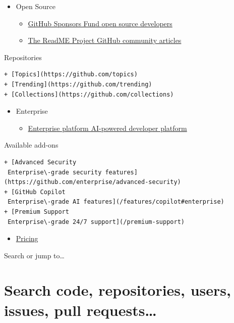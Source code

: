 \documentclass[
  letterpaper,
]{book}
\providecommand{\tightlist}{%
  \setlength{\itemsep}{0pt}\setlength{\parskip}{0pt}}\usepackage{longtable,booktabs,array}
\begin{document}
\begin{itemize}
\item
  Open Source

  \begin{itemize}
  \item
    \href{./sponsors}{GitHub Sponsors Fund open source developers}
  \item
    \href{https://github.com/readme}{The ReadME Project GitHub community
    articles}
  \end{itemize}
\end{itemize}

Repositories

\begin{verbatim}
+ [Topics](https://github.com/topics)
+ [Trending](https://github.com/trending)
+ [Collections](https://github.com/collections)
\end{verbatim}

\begin{itemize}
\item
  Enterprise

  \begin{itemize}
  \tightlist
  \item
    \href{./enterprise}{Enterprise platform AI-powered developer
    platform}
  \end{itemize}
\end{itemize}

Available add-ons

\begin{verbatim}
+ [Advanced Security
 Enterprise\-grade security features](https://github.com/enterprise/advanced-security)
+ [GitHub Copilot
 Enterprise\-grade AI features](/features/copilot#enterprise)
+ [Premium Support
 Enterprise\-grade 24/7 support](/premium-support)
\end{verbatim}

\begin{itemize}
\tightlist
\item
  \href{https://github.com/pricing}{Pricing}
\end{itemize}

Search or jump to\ldots{}


\chapter{Search code, repositories, users, issues, pull
requests\ldots{}}\label{search-code-repositories-users-issues-pull-requests}
\end{document}
